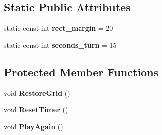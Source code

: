 \subsection*{Static Public Attributes}
\begin{DoxyCompactItemize}
\item 
static const int {\bfseries rect\+\_\+margin} = 20\hypertarget{class_game_view_a7044d555439ae4b05b2d06c2ee63d294}{}\label{class_game_view_a7044d555439ae4b05b2d06c2ee63d294}

\item 
static const int {\bfseries seconds\+\_\+turn} = 15\hypertarget{class_game_view_a5fc396e1ec2179e006f4e6dd0f9915cb}{}\label{class_game_view_a5fc396e1ec2179e006f4e6dd0f9915cb}

\end{DoxyCompactItemize}
\subsection*{Protected Member Functions}
\begin{DoxyCompactItemize}
\item 
void {\bfseries Restore\+Grid} ()\hypertarget{class_game_view_a6e52f2706160a781da99bdeb5a2a6082}{}\label{class_game_view_a6e52f2706160a781da99bdeb5a2a6082}

\item 
void {\bfseries Reset\+Timer} ()\hypertarget{class_game_view_af23e016497d307afd3b8eebd41086de0}{}\label{class_game_view_af23e016497d307afd3b8eebd41086de0}

\item 
void {\bfseries Play\+Again} ()\hypertarget{class_game_view_a53c1f97294b6be0e41cc627fc21abd5d}{}\label{class_game_view_a53c1f97294b6be0e41cc627fc21abd5d}

\end{DoxyCompactItemize}
